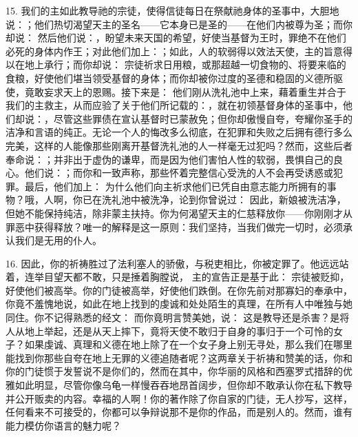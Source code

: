 15. 我们的主如此教导祂的宗徒，使得信徒每日在祭献祂身体的圣事中，大胆地说：；他们热切渴望天主的圣名——它本身已是圣的——在他们内被尊为圣；而你却说： 然后他们说：，盼望未来天国的希望，好使当基督为王时，罪绝不在他们必死的身体内作王；对此他们加上：；如此，人的软弱得以效法天使，主的旨意得以在地上承行；而你却说： 宗徒祈求日用粮，或那超越一切食物的、将要来临的食粮，好使他们堪当领受基督的身体；而你却被你过度的圣德和稳固的义德所驱使，竟敢妄求天上的恩赐。接下来是： 他们刚从洗礼池中上来，藉着重生并合于我们的主救主，从而应验了关于他们所记载的：，就在初领基督身体的圣事中，他们却说：，尽管这些罪债在宣认基督时已蒙赦免；但你却傲慢自夸，夸耀你圣手的洁净和言语的纯正。无论一个人的悔改多么彻底，在犯罪和失败之后拥有德行多么完美，这样的人能像那些刚离开基督洗礼池的人一样毫无过犯吗？然而，这些后者奉命说：；并非出于虚伪的谦卑，而是因为他们害怕人性的软弱，畏惧自己的良心。他们说：；而你和一致声称，那些怀着完整信心受洗的人不会再受诱惑或犯罪。最后，他们加上： 为什么他们向主祈求他们已凭自由意志能力所拥有的事物？哦，人啊，你已在洗礼池中被洗净，论到你曾说过： 因此，新娘被洗洁净，但她不能保持纯洁，除非蒙主扶持。你为何渴望天主的仁慈释放你——你刚刚才从罪恶中获得释放？唯一的解释是这一原则：我们坚持，当我们做完一切时，必须承认我们是无用的仆人。\par

16. 因此，你的祈祷胜过了法利塞人的骄傲，与税吏相比，你被定罪了。他远远站着，连举目望天都不敢，只是捶着胸膛说， 主的宣告正是基于此： 宗徒被贬抑，好使他们被高举。你的门徒被高举，好使他们跌倒。在你先前对那寡妇的奉承中，你竟不羞愧地说，如此在地上找到的虔诚和处处陌生的真理，在所有人中唯独与她同住。你不记得熟悉的经文： 而你竟明言赞美她，说： 这是教导还是杀害？是将人从地上举起，还是从天上摔下，竟将天使不敢归于自身的事归于一个可怜的女子？如果虔诚、真理和义德在地上除了在一个女子身上别无寻处，那么我们在哪里能找到你那些自夸在地上无罪的义德追随者呢？这两章关于祈祷和赞美的话，你和你的门徒惯于发誓说不是你们的，然而在其中，你华丽的风格和西塞罗式措辞的优雅如此明显，尽管你像乌龟一样慢吞吞地昂首阔步，但你却不敢承认你在私下教导并公开贩卖的内容。幸福的人啊！你的著作除了你自家的门徒，无人抄写，这样，任何看来不可接受的，你都可以争辩说那不是你的作品，而是别人的。然而，谁有能力模仿你语言的魅力呢？\par

